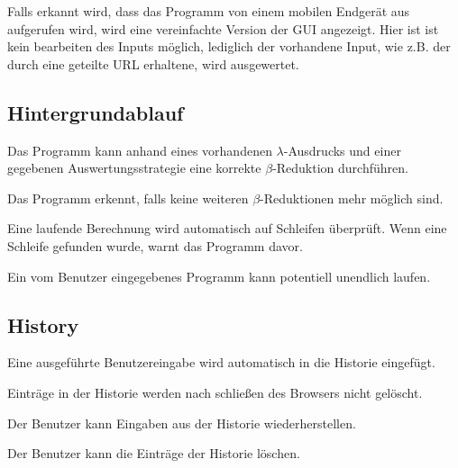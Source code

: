 \documentclass[parskip=full,11pt,twoside]{scrartcl}
\begin{document}
Falls erkannt wird, dass das Programm von einem mobilen Endgerät aus aufgerufen wird, wird eine vereinfachte Version der GUI angezeigt. Hier ist ist kein bearbeiten des Inputs möglich, lediglich der vorhandene Input, wie z.B. der durch eine geteilte URL erhaltene, wird ausgewertet.




\subsection{Hintergrundablauf}

Das Programm kann anhand eines vorhandenen $\lambda$-Ausdrucks und einer gegebenen Auswertungsstrategie eine korrekte $\beta$-Reduktion durchführen.

Das Programm erkennt, falls keine weiteren $\beta$-Reduktionen mehr möglich sind.

Eine laufende Berechnung wird automatisch auf Schleifen überprüft. Wenn eine Schleife gefunden wurde, warnt das Programm davor.

Ein vom Benutzer eingegebenes Programm kann potentiell unendlich laufen.




\subsection{History}

Eine ausgeführte Benutzereingabe wird automatisch in die Historie eingefügt.

Einträge in der Historie werden nach schließen des Browsers nicht gelöscht.

Der Benutzer kann Eingaben aus der Historie wiederherstellen.

Der Benutzer kann die Einträge der Historie löschen.
\end{document}
